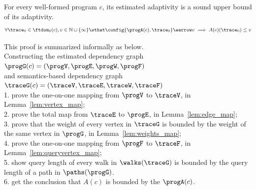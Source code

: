   
\begin{theorem}
	For every well-formed program $c$, 
	its estimated adaptivity is a sound upper bound of its adaptivity.
	 \[
		\forall \trace_0 \in \ftdom_{0}(c), v \in \mathbb{N} \cup \{\infty\} \sthat
		\config{\progA(c), \trace_0} \earrow v \implies A(c)(\trace_0) \leq v
  \] 
  \end{theorem}
This proof is summarized informally as below.
\\
Constructing the
estimated dependency graph $\progG({c}) = (\progV, \progE, \progW, \progF)$
\\
and semantics-based dependency graph $\traceG({c}) = (\traceV, \traceE, \traceW, \traceF)$ 
\\
1. prove the one-on-one mapping from $\progV$ to $\traceV$, in Lemma~\ref{lem:vertex_map};
\\
2. prove the total map from $\traceE$ to $\progE$, in Lemma~\ref{lem:edge_map};
\\
3. prove that the weight of every vertex in $\traceG$ is bounded by the weight of the same vertex in $\progG$, in 
Lemma~\ref{lem:weights_map};
\\
4. prove the one-on-one mapping from $\progF$ to $\traceF$, in Lemma~\ref{lem:queryvertex_map};
\\
5. show query length of every walk in $\walks(\traceG)$ is bounded by 
the query length of a path in $\paths(\progG)$.
\\
6. get the conclusion that $A(c)$ is bounded by 
the $\progA(c)$.
%
